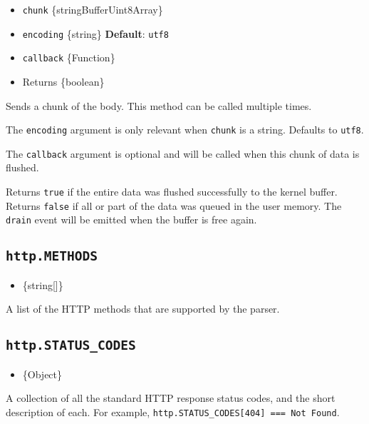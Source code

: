 \begin{itemize}
\tightlist
\item
  \texttt{chunk} \{string\textbar Buffer\textbar Uint8Array\}
\item
  \texttt{encoding} \{string\} \textbf{Default}: \texttt{utf8}
\item
  \texttt{callback} \{Function\}
\item
  Returns \{boolean\}
\end{itemize}

Sends a chunk of the body. This method can be called multiple times.

The \texttt{encoding} argument is only relevant when \texttt{chunk} is a
string. Defaults to \texttt{\textquotesingle{}utf8\textquotesingle{}}.

The \texttt{callback} argument is optional and will be called when this
chunk of data is flushed.

Returns \texttt{true} if the entire data was flushed successfully to the
kernel buffer. Returns \texttt{false} if all or part of the data was
queued in the user memory. The
\texttt{\textquotesingle{}drain\textquotesingle{}} event will be emitted
when the buffer is free again.

\subsection{\texorpdfstring{\texttt{http.METHODS}}{http.METHODS}}\label{http.methods}

\begin{itemize}
\tightlist
\item
  \{string{[}{]}\}
\end{itemize}

A list of the HTTP methods that are supported by the parser.

\subsection{\texorpdfstring{\texttt{http.STATUS\_CODES}}{http.STATUS\_CODES}}\label{http.status_codes}

\begin{itemize}
\tightlist
\item
  \{Object\}
\end{itemize}

A collection of all the standard HTTP response status codes, and the
short description of each. For example,
\texttt{http.STATUS\_CODES{[}404{]}\ ===\ \textquotesingle{}Not\ Found\textquotesingle{}}.

